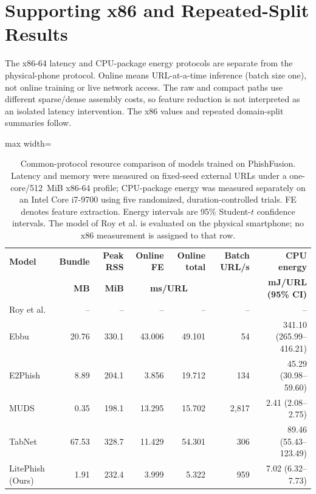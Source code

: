 \documentclass[10pt]{article}
\newenvironment{bluechange}{\color{black}}{}
\begin{document}
\section{Supporting x86 and Repeated-Split Results}
\begin{bluechange}
The x86-64 latency and CPU-package energy protocols are separate from the physical-phone protocol. Online means URL-at-a-time inference (batch size one), not online training or live network access. The raw and compact paths use different sparse/dense assembly costs, so feature reduction is not interpreted as an isolated latency intervention. The x86 values and repeated domain-split summaries follow.
\begin{table}[!t]
\centering
\caption{Common-protocol resource comparison of models trained on PhishFusion. Latency and memory were measured on fixed-seed external URLs under a one-core/512~MiB x86-64 profile; CPU-package energy was measured separately on an Intel Core i7-9700 using five randomized, duration-controlled trials. FE denotes feature extraction. Energy intervals are 95\% Student-$t$ confidence intervals. The model of Roy et al. is evaluated on the physical smartphone; no x86 measurement is assigned to that row.}
\label{tab:inference_time}
\scriptsize
\setlength{\tabcolsep}{4pt}
\renewcommand{\arraystretch}{1.08}
\begin{adjustbox}{max width=\textwidth}
\begin{tabular}{lrrrrrr}
\toprule
\textbf{Model} & \textbf{Bundle} & \textbf{Peak RSS} & \textbf{Online FE} & \textbf{Online total} & \textbf{Batch URL/s} & \textbf{CPU energy} \\
 & \textbf{MB} & \textbf{MiB} & \multicolumn{2}{c}{\textbf{ms/URL}} & & \textbf{mJ/URL (95\% CI)} \\
\midrule
Roy et al. & -- & -- & -- & -- & -- & -- \\
Ebbu             & 20.76 & 330.1 & 43.006 & 49.101 & 54    & 341.10 (265.99--416.21) \\
E2Phish          & 8.89  & 204.1 & 3.856  & 19.712 & 134   & 45.29 (30.98--59.60) \\
MUDS             & 0.35  & 198.1 & 13.295 & 15.702 & 2,817 & 2.41 (2.08--2.75) \\
TabNet           & 67.53 & 328.7 & 11.429 & 54.301 & 306   & 89.46 (55.43--123.49) \\
LitePhish (Ours) & 1.91  & 232.4 & 3.999  & 5.322  & 959   & 7.02 (6.32--7.73) \\
\bottomrule
\end{tabular}

\end{adjustbox}
\end{table}
\end{bluechange}
\end{document}
